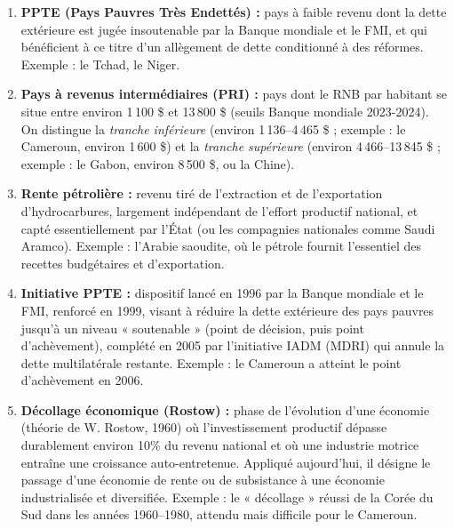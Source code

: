 \documentclass[11pt]{article}
\begin{document}
\begin{corrige}
\begin{enumerate}
\item \textbf{PPTE (Pays Pauvres Très Endettés) :} pays à faible revenu dont la dette extérieure est jugée insoutenable par la Banque mondiale et le FMI, et qui bénéficient à ce titre d'un allègement de dette conditionné à des réformes. Exemple : le Tchad, le Niger.
\item \textbf{Pays à revenus intermédiaires (PRI) :} pays dont le RNB par habitant se situe entre environ 1\,100 \$ et 13\,800 \$ (seuils Banque mondiale 2023-2024). On distingue la \emph{tranche inférieure} (environ 1\,136--4\,465 \$ ; exemple : le Cameroun, environ 1\,600 \$) et la \emph{tranche supérieure} (environ 4\,466--13\,845 \$ ; exemple : le Gabon, environ 8\,500 \$, ou la Chine).
\item \textbf{Rente pétrolière :} revenu tiré de l'extraction et de l'exportation d'hydrocarbures, largement indépendant de l'effort productif national, et capté essentiellement par l'État (ou les compagnies nationales comme Saudi Aramco). Exemple : l'Arabie saoudite, où le pétrole fournit l'essentiel des recettes budgétaires et d'exportation.
\item \textbf{Initiative PPTE :} dispositif lancé en 1996 par la Banque mondiale et le FMI, renforcé en 1999, visant à réduire la dette extérieure des pays pauvres jusqu'à un niveau « soutenable » (point de décision, puis point d'achèvement), complété en 2005 par l'initiative IADM (MDRI) qui annule la dette multilatérale restante. Exemple : le Cameroun a atteint le point d'achèvement en 2006.
\item \textbf{Décollage économique (Rostow) :} phase de l'évolution d'une économie (théorie de W. Rostow, 1960) où l'investissement productif dépasse durablement environ 10\% du revenu national et où une industrie motrice entraîne une croissance auto-entretenue. Appliqué aujourd'hui, il désigne le passage d'une économie de rente ou de subsistance à une économie industrialisée et diversifiée. Exemple : le « décollage » réussi de la Corée du Sud dans les années 1960--1980, attendu mais difficile pour le Cameroun.
\end{enumerate}
\end{corrige}
\end{document}
